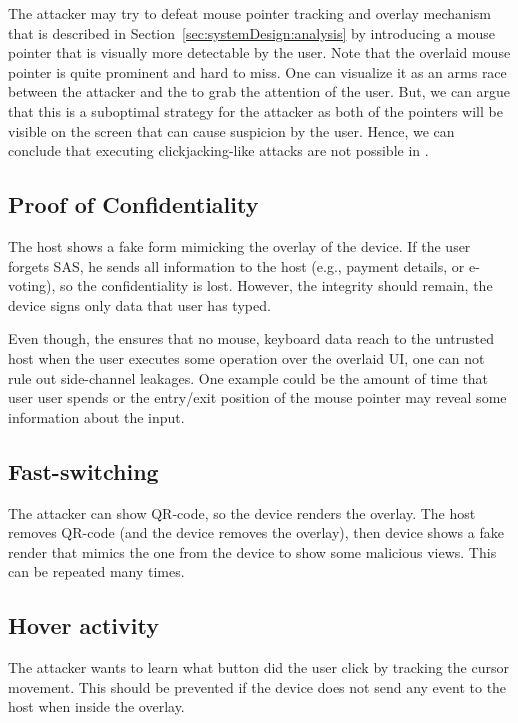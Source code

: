  The attacker may try to defeat \name mouse pointer tracking and overlay mechanism that is described in Section~\ref{sec:systemDesign:analysis} by introducing a mouse pointer that is visually more detectable by the user. Note that the \device overlaid mouse pointer is quite prominent and hard to miss. One can visualize it as an arms race between the attacker and the \device to grab the attention of the user. But, we can argue that this is a suboptimal strategy for the attacker as both of the pointers will be visible on the screen that can cause suspicion by the user. Hence, we can conclude that executing clickjacking-like attacks are not possible in \name.

\subsection{Proof of Confidentiality}
The host shows a fake form mimicking the overlay of the device. If the user forgets SAS, he sends all information to the host (e.g., payment details, or e-voting), so the confidentiality is lost. However, the integrity should remain, the device signs only data that user has typed.

 Even though, the \device ensures that no mouse, keyboard data reach to the untrusted host when the user executes some operation over the overlaid UI, one can not rule out side-channel leakages. One example could be the amount of time that user user spends or the entry/exit position of the mouse pointer may reveal some information about the input. 

\subsection{Fast-switching}
The attacker can show QR-code, so the device renders the overlay. The host removes QR-code (and the device removes the overlay), then device shows a fake render that mimics the one from the device to show some malicious views. This can be repeated many times.

\subsection{Hover activity}
The attacker wants to learn what button did the user click by tracking the cursor movement. This should be prevented if the device does not send any event to the host when inside the overlay.


